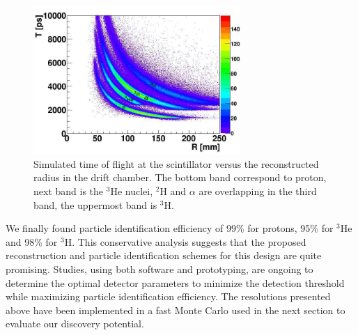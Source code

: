 \begin{figure}[ht!]
    \begin{center}
        \includegraphics[width=0.7\textwidth]{./../Detector/fig-chap2/Bare_3atm_1atm_RvsTime_named}
        \caption{Simulated time of flight at the scintillator versus the reconstructed radius in the drift chamber. The bottom band correspond to proton, next band is the $^3$He nuclei, $^2$H and $\alpha$ are overlapping in the third band, the uppermost band is $^3$H.\label{fig:SIMtof}}
    \end{center}
\end{figure}

We finally found particle identification efficiency of 99\% for protons, 95\% for $^3$He and 98\% for $^3$H. This conservative analysis suggests that the proposed reconstruction and particle identification schemes for this design are quite promising. Studies, using both software and prototyping, are ongoing to determine the optimal detector parameters to minimize the detection threshold while maximizing particle identification efficiency. The resolutions presented above have been implemented in a fast Monte Carlo used in the next section to evaluate our discovery potential.


